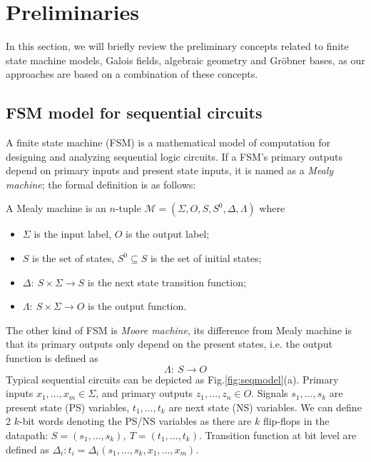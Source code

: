 %


\section{Preliminaries}

In this section, we will briefly review the preliminary concepts
related to finite state machine models, Galois fields, algebraic geometry and Gr\"obner bases, as
our approaches are based on a combination of these concepts. 

\subsection{FSM model for sequential circuits}
A finite state machine (FSM) is a mathematical model of computation for designing and analyzing sequential logic 
circuits. If a FSM's primary outputs depend on primary inputs and present state inputs, it is named as a \textit{Mealy machine};
the formal definition is as follows:
\begin{Definition}
A Mealy machine is an $n$-tuple $\mathcal M = (\Sigma,O,S,S^0,\Delta,\Lambda)$ where
\begin{itemize}
\item $\Sigma$ is the input label, $O$ is the output label;
\item $S$ is the set of states, $S^0\subseteq S$ is the set of initial states;
\item $\Delta:\ S\times\Sigma\to S$ is the next state transition function;
\item $\Lambda:\ S\times\Sigma\to O$ is the output function.
\end{itemize}
\end{Definition}
The other kind of FSM is \textit{Moore machine}, its difference from Mealy machine is that
its primary outputs only depend on the present states, i.e. the output function is defined as
$$\Lambda:\ S \to O$$
Typical sequential circuits can be depicted as Fig.\ref{fig:seqmodel}(a). Primary inputs
$x_1,\dots,x_m \in \Sigma$, and primary outputs $z_1,\dots,z_n\in O$. Signals $s_1,\dots,s_k$ 
are present state (PS) variables, $t_1,\dots,t_k$ are next state (NS) variables.
We can define 2 $k$-bit words denoting the PS/NS variables as there are $k$ flip-flops
in the datapath: $S = (s_1,\dots,s_k), ~T=(t_1,\dots,t_k)$. Transition function
at bit level are defined as $\Delta_i: t_i = \Delta_i(s_1,\dots,s_k,x_1,\dots,x_m)$.
